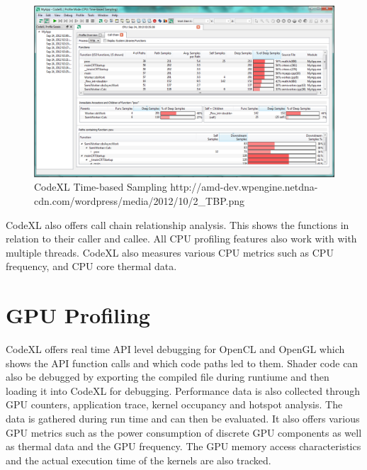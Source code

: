 \begin{figure}[htbp]
\includegraphics[scale = 0.23]{img/AMD_Sampling.png}
\caption{CodeXL Time-based Sampling 
http://amd-dev.wpengine.netdna-cdn.com/wordpress/media/2012/10/2\_TBP.png}
\label{fig:AMD_Sampling}
\end{figure}

CodeXL also offers call chain relationship analysis. This shows the functions in relation to their caller and callee. All CPU profiling features also work with with multiple threads. CodeXL also measures various CPU metrics such as CPU frequency, and CPU core thermal data.
\citep{amd_codexl}

\section{GPU Profiling}
CodeXL offers real time API level debugging for OpenCL and OpenGL which shows the API function calls and which code paths led to them. Shader code can also be debugged by exporting the compiled file during runtiume and then loading it into CodeXL for debugging. Performance data is also collected through GPU counters, application trace, kernel occupancy and hotspot analysis. The data is gathered during run time and can then be evaluated. It also offers various GPU metrics such as the power consumption of discrete GPU components as well as thermal data and the GPU frequency. The GPU memory access characteristics and the actual execution time of the kernels are also tracked.
\citep{amd_codexl, amd_codexl_details}






